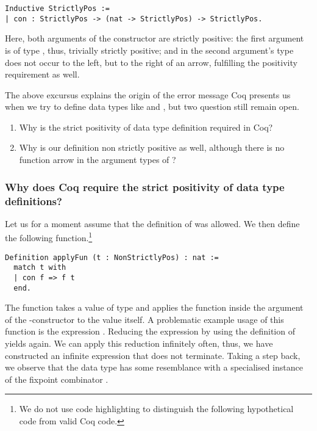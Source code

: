 \begin{verbatim}
Inductive StrictlyPos :=
| con : StrictlyPos -> (nat -> StrictlyPos) -> StrictlyPos.
\end{verbatim}

Here, both arguments of the constructor  are strictly positive: the first argument is of type , thus, trivially strictly positive; and in the second argument's type  does not occur to the left, but to the right of an arrow, fulfilling the positivity requirement as well.

The above excursus explains the origin of the error message Coq presents us when we try to define data types like  and , but two question still remain open.

\begin{enumerate}
\item Why is the strict positivity of data type definition required in Coq?
\item Why is our definition  non strictly positive as well, although there is no function arrow in the argument types of ?
\end{enumerate}

\subsubsection{Why does Coq require the strict positivity of data type definitions?}

Let us for a moment assume that the definition of  was allowed.
We then define the following function.\footnote{We do not use code highlighting to distinguish the following hypothetical code from valid Coq code.}

\begin{verbatim}
Definition applyFun (t : NonStrictlyPos) : nat :=
  match t with
  | con f => f t
  end.
\end{verbatim}

The function  takes a value  of type  and applies the function  inside the
argument of the \--constructor to the value  itself.
A problematic example usage of this function is the expression .
Reducing the expression by using the definition of  yields  again.
We can apply this reduction infinitely often, thus, we have constructed an infinite expression that does not terminate.
Taking a step back, we observe that the data type  has some resemblance with a specialised instance
of the fixpoint combinator .

